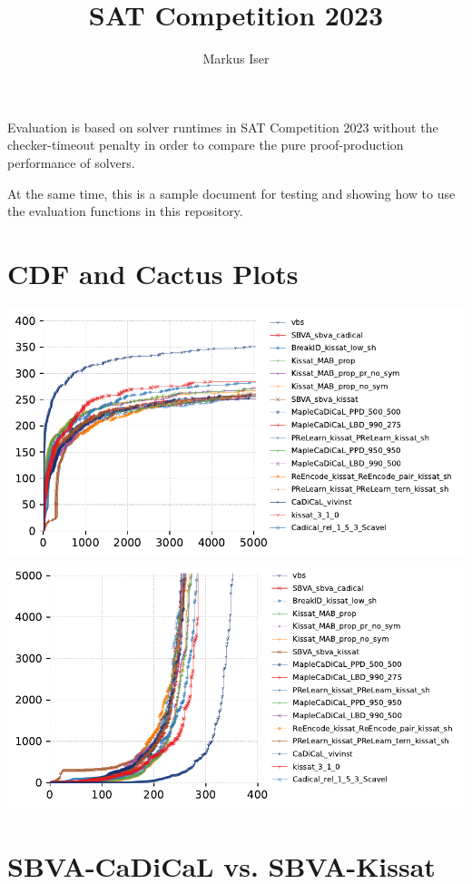 \documentclass{article}
\date{}
\title{SAT Competition 2023}
\author{Markus Iser}
\begin{document}
\maketitle

Evaluation is based on solver runtimes in SAT Competition 2023 without the checker-timeout penalty 
in order to compare the pure proof-production performance of solvers.

At the same time, this is a sample document for testing and showing 
how to use the evaluation functions in this repository.

\section{CDF and Cactus Plots}

\includegraphics{gen/sc2023/cdf.pdf}
\includegraphics{gen/sc2023/cactus.pdf}


\section{SBVA-CaDiCaL vs. SBVA-Kissat}


\end{document}
